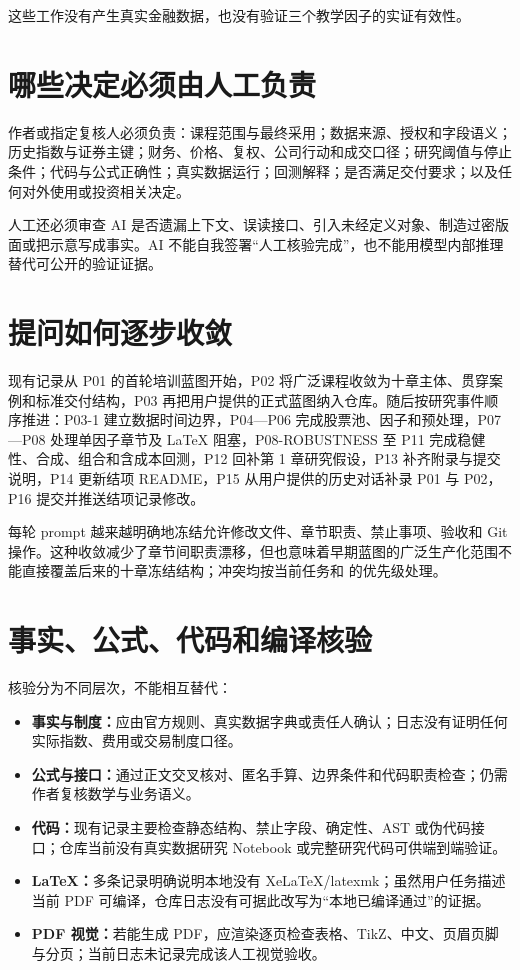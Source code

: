 这些工作没有产生真实金融数据，也没有验证三个教学因子的实证有效性。

\section{哪些决定必须由人工负责}

作者或指定复核人必须负责：课程范围与最终采用；数据来源、授权和字段语义；历史指数与证券主键；财务、价格、复权、公司行动和成交口径；研究阈值与停止条件；代码与公式正确性；真实数据运行；回测解释；是否满足交付要求；以及任何对外使用或投资相关决定。

人工还必须审查 AI 是否遗漏上下文、误读接口、引入未经定义对象、制造过密版面或把示意写成事实。AI 不能自我签署“人工核验完成”，也不能用模型内部推理替代可公开的验证证据。

\section{提问如何逐步收敛}

现有记录从 P01 的首轮培训蓝图开始，P02 将广泛课程收敛为十章主体、贯穿案例和标准交付结构，P03 再把用户提供的正式蓝图纳入仓库。随后按研究事件顺序推进：P03-1 建立数据时间边界，P04—P06 完成股票池、因子和预处理，P07—P08 处理单因子章节及 LaTeX 阻塞，P08-ROBUSTNESS 至 P11 完成稳健性、合成、组合和含成本回测，P12 回补第 1 章研究假设，P13 补齐附录与提交说明，P14 更新结项 README，P15 从用户提供的历史对话补录 P01 与 P02，P16 提交并推送结项记录修改。

每轮 prompt 越来越明确地冻结允许修改文件、章节职责、禁止事项、验收和 Git 操作。这种收敛减少了章节间职责漂移，但也意味着早期蓝图的广泛生产化范围不能直接覆盖后来的十章冻结结构；冲突均按当前任务和  的优先级处理。

\section{事实、公式、代码和编译核验}

核验分为不同层次，不能相互替代：

\begin{itemize}
  \item \textbf{事实与制度：}应由官方规则、真实数据字典或责任人确认；日志没有证明任何实际指数、费用或交易制度口径。
  \item \textbf{公式与接口：}通过正文交叉核对、匿名手算、边界条件和代码职责检查；仍需作者复核数学与业务语义。
  \item \textbf{代码：}现有记录主要检查静态结构、禁止字段、确定性、AST 或伪代码接口；仓库当前没有真实数据研究 Notebook 或完整研究代码可供端到端验证。
  \item \textbf{LaTeX：}多条记录明确说明本地没有 XeLaTeX/latexmk；虽然用户任务描述当前 PDF 可编译，仓库日志没有可据此改写为“本地已编译通过”的证据。
  \item \textbf{PDF 视觉：}若能生成 PDF，应渲染逐页检查表格、TikZ、中文、页眉页脚与分页；当前日志未记录完成该人工视觉验收。
\end{itemize}


